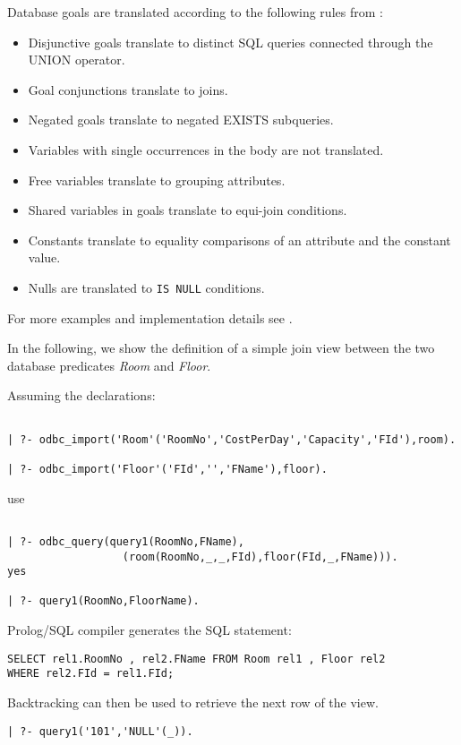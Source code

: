 Database goals are translated according to the following rules
from \cite{Drax92}:
\begin{itemize}
\item Disjunctive goals translate to distinct SQL queries
        connected through the UNION operator.
\item Goal conjunctions translate to joins.
\item Negated goals translate to negated EXISTS subqueries.
\item Variables with single occurrences in the body are not
          translated.
\item Free variables translate to grouping attributes.
\item Shared variables in goals translate to equi-join conditions.
\item Constants translate to equality comparisons of an attribute and
          the constant value.
\item Nulls are translated to {\tt IS NULL} conditions.
\end{itemize}
For more examples and implementation details see \cite{Drax92}.
 
In the following, we show the definition of a simple join view between the 
two database predicates {\it Room} and {\it Floor}.

Assuming the declarations:
\begin{verbatim}

| ?- odbc_import('Room'('RoomNo','CostPerDay','Capacity','FId'),room).

| ?- odbc_import('Floor'('FId','','FName'),floor).
\end{verbatim}

use

\begin{verbatim}

| ?- odbc_query(query1(RoomNo,FName),
                  (room(RoomNo,_,_,FId),floor(FId,_,FName))).
yes

| ?- query1(RoomNo,FloorName).
\end{verbatim}

Prolog/SQL compiler generates the SQL statement:
\begin{verbatim}
SELECT rel1.RoomNo , rel2.FName FROM Room rel1 , Floor rel2 
WHERE rel2.FId = rel1.FId;
\end{verbatim}

Backtracking can then be used to retrieve the next row of the view.
\begin{verbatim}
| ?- query1('101','NULL'(_)).
\end{verbatim}

